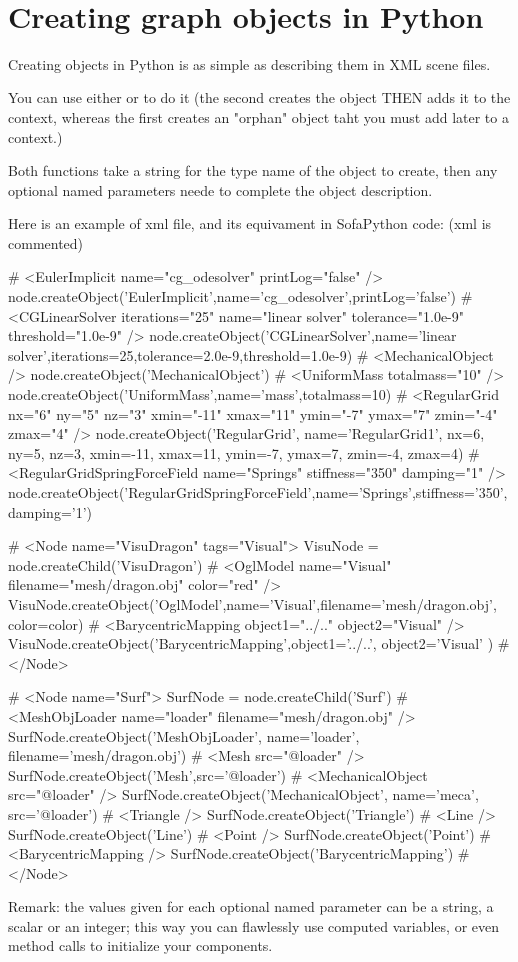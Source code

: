 \
\section{Creating graph objects in Python}


Creating objects in Python is as simple as describing them in XML scene files.

You can use either  or  to do it (the second creates the object THEN adds it to the context, whereas the first creates an "orphan" object taht you must add later to a context.)

Both functions take a string for the type name of the object to create, then any optional named parameters neede to complete the object description.

Here is an example of xml file, and its equivament in SofaPython code: (xml is commented)

\begin{code_python}
#        <EulerImplicit name="cg_odesolver" printLog="false" />
	node.createObject('EulerImplicit',name='cg_odesolver',printLog='false')
#        <CGLinearSolver iterations="25" name="linear solver" tolerance="1.0e-9" threshold="1.0e-9" />
	node.createObject('CGLinearSolver',name='linear solver',iterations=25,tolerance=2.0e-9,threshold=1.0e-9)
#        <MechanicalObject />
	node.createObject('MechanicalObject')
#        <UniformMass totalmass="10" />
	node.createObject('UniformMass',name='mass',totalmass=10)
#        <RegularGrid nx="6" ny="5" nz="3" xmin="-11" xmax="11" ymin="-7" ymax="7" zmin="-4" zmax="4" />
	node.createObject('RegularGrid', name='RegularGrid1', nx=6, ny=5, nz=3, xmin=-11, xmax=11, ymin=-7, ymax=7, zmin=-4, zmax=4)
#        <RegularGridSpringForceField name="Springs" stiffness="350" damping="1" />
	node.createObject('RegularGridSpringForceField',name='Springs',stiffness='350', damping='1')

#        <Node name="VisuDragon" tags="Visual">
	VisuNode = node.createChild('VisuDragon')
#            <OglModel name="Visual" filename="mesh/dragon.obj" color="red" />
	VisuNode.createObject('OglModel',name='Visual',filename='mesh/dragon.obj', color=color)
#            <BarycentricMapping object1="../.." object2="Visual" />
	VisuNode.createObject('BarycentricMapping',object1='../..', object2='Visual' )
#        </Node>	

#        <Node name="Surf">
	SurfNode = node.createChild('Surf')
#            <MeshObjLoader name="loader" filename="mesh/dragon.obj" />
	SurfNode.createObject('MeshObjLoader', name='loader', filename='mesh/dragon.obj')
#            <Mesh src="@loader" />
	SurfNode.createObject('Mesh',src='@loader')
#            <MechanicalObject src="@loader" />
	SurfNode.createObject('MechanicalObject', name='meca', src='@loader')
#            <Triangle />
	SurfNode.createObject('Triangle')
#            <Line />
	SurfNode.createObject('Line')
#            <Point />
	SurfNode.createObject('Point')
#            <BarycentricMapping />
	SurfNode.createObject('BarycentricMapping')
#        </Node>	


\end{code_python}


Remark: the values given for each optional named parameter can be a string, a scalar or an integer; this way you can flawlessly use computed variables, or even method calls to initialize your components.

